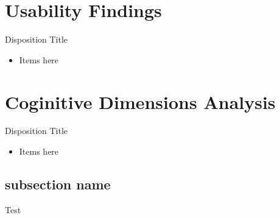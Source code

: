 \section{Usability Findings}
\begin{frame}{\secname}{Disposition}
	Title
	\begin{itemize}
		\item Items here
	\end{itemize}
\end{frame}

\section{Coginitive Dimensions Analysis}
\begin{frame}{\secname}{Disposition}
	Title
	\begin{itemize}
		\item Items here
	\end{itemize}
\end{frame}

\subsection{subsection name}
\begin{frame}{\secname}{\subname}
	Test
\end{frame}

